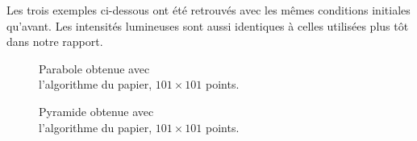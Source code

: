 Les trois exemples ci-dessous ont été retrouvés avec les mêmes conditions initiales qu'avant. Les intensités lumineuses sont aussi identiques à celles utilisées plus tôt dans notre rapport.
\begin{figure}[!htb]
    \centering
    \begin{minipage}[t]{0.48\textwidth}
        \centering
        \caption{Parabole obtenue avec \\ \centering l'algorithme du papier, $101\times101$ points.}
        \label{Fig:parabole_opti}
    \end{minipage}%
    \hfill
    \begin{minipage}[t]{0.48\textwidth}
        \centering
        \caption{Pyramide obtenue avec \\ \centering l'algorithme du papier, $101\times101$ points.}
        \label{Fig:pyramide_opti}
    \end{minipage}
\end{figure}

